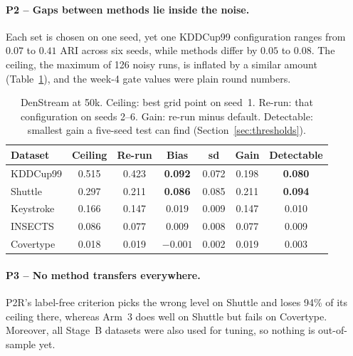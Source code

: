 \paragraph{P2 -- Gaps between methods lie inside the noise.}
Each set is chosen on one seed, yet one KDDCup99 configuration ranges from $0.07$ to $0.41$ ARI across six seeds, while methods differ by $0.05$ to $0.08$. The ceiling, the maximum of 126 noisy runs, is inflated by a similar amount (Table~\ref{tab:noise}), and the week-4 gate values were plain round numbers.

\begin{table}[H]
\centering
\caption{DenStream at 50k. Ceiling: best grid point on seed~1. Re-run: that configuration on seeds 2--6. Gain: re-run minus default. Detectable: smallest gain a five-seed test can find (Section~\ref{sec:thresholds}).}
\label{tab:noise}
\small
\begin{tabular}{@{}l c c c c c c@{}}
\toprule
\textbf{Dataset} & \textbf{Ceiling} & \textbf{Re-run} & \textbf{Bias} & \textbf{sd} & \textbf{Gain} & \textbf{Detectable} \\
\midrule
KDDCup99  & 0.515 & 0.423 & \textbf{0.092} & 0.072 & 0.198 & \textbf{0.080} \\
Shuttle   & 0.297 & 0.211 & \textbf{0.086} & 0.085 & 0.211 & \textbf{0.094} \\
Keystroke & 0.166 & 0.147 & 0.019 & 0.009 & 0.147 & 0.010 \\
INSECTS   & 0.086 & 0.077 & 0.009 & 0.008 & 0.077 & 0.009 \\
Covertype & 0.018 & 0.019 & $-0.001$ & 0.002 & 0.019 & 0.003 \\
\bottomrule
\end{tabular}
\end{table}

\paragraph{P3 -- No method transfers everywhere.}
P2R's label-free criterion picks the wrong level on Shuttle and loses 94\% of its ceiling there, whereas Arm~3 does well on Shuttle but fails on Covertype. Moreover, all Stage~B datasets were also used for tuning, so nothing is out-of-sample yet.
